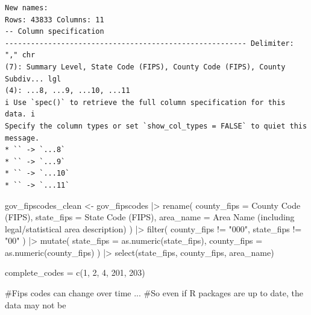 \documentclass[
  letterpaper,
  DIV=11,
  numbers=noendperiod]{scrartcl}
\newenvironment{Shaded}{\begin{snugshade}}{\end{snugshade}}
\newcommand{\AttributeTok}[1]{\textcolor[rgb]{0.40,0.45,0.13}{#1}}
\newcommand{\CommentTok}[1]{\textcolor[rgb]{0.37,0.37,0.37}{#1}}
\newcommand{\DecValTok}[1]{\textcolor[rgb]{0.68,0.00,0.00}{#1}}
\newcommand{\FunctionTok}[1]{\textcolor[rgb]{0.28,0.35,0.67}{#1}}
\newcommand{\NormalTok}[1]{\textcolor[rgb]{0.00,0.23,0.31}{#1}}
\newcommand{\OtherTok}[1]{\textcolor[rgb]{0.00,0.23,0.31}{#1}}
\newcommand{\SpecialCharTok}[1]{\textcolor[rgb]{0.37,0.37,0.37}{#1}}
\newcommand{\StringTok}[1]{\textcolor[rgb]{0.13,0.47,0.30}{#1}}
\begin{document}
\begin{verbatim}
New names:
Rows: 43833 Columns: 11
-- Column specification
-------------------------------------------------------- Delimiter: "," chr
(7): Summary Level, State Code (FIPS), County Code (FIPS), County Subdiv... lgl
(4): ...8, ...9, ...10, ...11
i Use `spec()` to retrieve the full column specification for this data. i
Specify the column types or set `show_col_types = FALSE` to quiet this message.
* `` -> `...8`
* `` -> `...9`
* `` -> `...10`
* `` -> `...11`
\end{verbatim}

\begin{Shaded}
\begin{Highlighting}[]
\NormalTok{gov\_fipscodes\_clean }\OtherTok{\textless{}{-}}\NormalTok{ gov\_fipscodes }\SpecialCharTok{|\textgreater{}}
  \FunctionTok{rename}\NormalTok{(}
    \AttributeTok{county\_fips =} \StringTok{\textquotesingle{}County Code (FIPS)\textquotesingle{}}\NormalTok{,}
    \AttributeTok{state\_fips =} \StringTok{\textquotesingle{}State Code (FIPS)\textquotesingle{}}\NormalTok{,}
    \AttributeTok{area\_name =} \StringTok{\textquotesingle{}Area Name (including legal/statistical area description)\textquotesingle{}}
\NormalTok{  ) }\SpecialCharTok{|\textgreater{}}
  \FunctionTok{filter}\NormalTok{(}
\NormalTok{    county\_fips }\SpecialCharTok{!=} \StringTok{"000"}\NormalTok{,}
\NormalTok{    state\_fips }\SpecialCharTok{!=} \StringTok{"00"}
\NormalTok{  ) }\SpecialCharTok{|\textgreater{}}
  \FunctionTok{mutate}\NormalTok{(}
    \AttributeTok{state\_fips =} \FunctionTok{as.numeric}\NormalTok{(state\_fips),}
    \AttributeTok{county\_fips =} \FunctionTok{as.numeric}\NormalTok{(county\_fips)}
\NormalTok{  ) }\SpecialCharTok{|\textgreater{}}
  \FunctionTok{select}\NormalTok{(state\_fips, county\_fips, area\_name)}

\NormalTok{complete\_codes }\OtherTok{=} \FunctionTok{c}\NormalTok{(}\DecValTok{1}\NormalTok{, }\DecValTok{2}\NormalTok{, }\DecValTok{4}\NormalTok{, }\DecValTok{201}\NormalTok{, }\DecValTok{203}\NormalTok{)}

\CommentTok{\#Fips codes can change over time ...}
\CommentTok{\#So even if R packages are up to date, the data may not be}


\end{Highlighting}
\end{Shaded}
\end{document}

